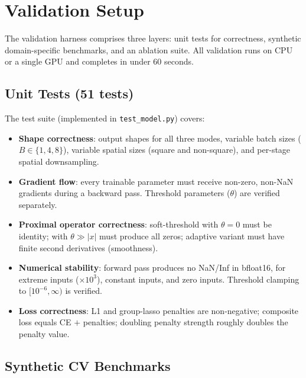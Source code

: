 \documentclass{article}
\begin{document}
\section{Validation Setup}
\label{sec:validation}

The validation harness comprises three layers: unit tests for correctness,
synthetic domain-specific benchmarks, and an ablation suite. All validation
runs on CPU or a single GPU and completes in under 60 seconds.

\subsection{Unit Tests (51 tests)}

The test suite (implemented in \texttt{test\_model.py}) covers:

\begin{itemize}
    \item \textbf{Shape correctness}: output shapes for all three modes,
          variable batch sizes ($B \in \{1, 4, 8\}$), variable spatial sizes
          (square and non-square), and per-stage spatial downsampling.
    \item \textbf{Gradient flow}: every trainable parameter must receive
          non-zero, non-NaN gradients during a backward pass. Threshold
          parameters ($\theta$) are verified separately.
    \item \textbf{Proximal operator correctness}: soft-threshold with
          $\theta=0$ must be identity; with $\theta \gg |x|$ must produce
          all zeros; adaptive variant must have finite second derivatives
          (smoothness).
    \item \textbf{Numerical stability}: forward pass produces no NaN/Inf in
          bfloat16, for extreme inputs ($\times 10^3$), constant inputs, and
          zero inputs. Threshold clamping to $[10^{-6}, \infty)$ is verified.
    \item \textbf{Loss correctness}: L1 and group-lasso penalties are
          non-negative; composite loss equals CE $+$ penalties; doubling
          penalty strength roughly doubles the penalty value.
\end{itemize}

\subsection{Synthetic CV Benchmarks}
\end{document}
